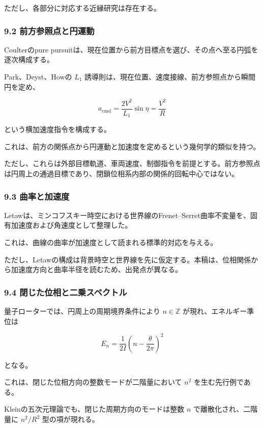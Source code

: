 \documentclass[
  10pt,
  a4paper,
]{ltjsarticle}
\begin{document}
ただし、各部分に対応する近縁研究は存在する。

\subsubsection{9.2
前方参照点と円運動}\label{ux524dux65b9ux53c2ux7167ux70b9ux3068ux5186ux904bux52d5}

Coulterのpure
pursuitは、現在位置から前方目標点を選び、その点へ至る円弧を逐次構成する。

Park、Deyst、Howの \(L_1\)
誘導則は、現在位置、速度接線、前方参照点から瞬間円を定め、

\[
a_{\mathrm{cmd}}
=\frac{2V^2}{L_1}\sin\eta
=\frac{V^2}{R}
\]

という横加速度指令を構成する。

これは、前方の関係点から円運動と加速度を定めるという幾何学的類似を持つ。

ただし、これらは外部目標軌道、車両速度、制御指令を前提とする。前方参照点は円周上の通過目標であり、閉鎖位相系内部の関係的回転中心ではない。

\subsubsection{9.3
曲率と加速度}\label{ux66f2ux7387ux3068ux52a0ux901fux5ea6}

Letawは、ミンコフスキー時空における世界線のFrenet--Serret曲率不変量を、固有加速度および角速度として整理した。

これは、曲線の曲率が加速度として読まれる標準的対応を与える。

ただし、Letawの構成は背景時空と世界線を先に仮定する。本稿は、位相関係から加速度方向と曲率半径を読むため、出発点が異なる。

\subsubsection{9.4
閉じた位相と二乗スペクトル}\label{ux9589ux3058ux305fux4f4dux76f8ux3068ux4e8cux4e57ux30b9ux30daux30afux30c8ux30eb}

量子ローターでは、円周上の周期境界条件により \(n\in\mathbb Z\)
が現れ、エネルギー準位は

\[
E_n
=\frac{1}{2I}
\left(
n-\frac{\theta}{2\pi}
\right)^2
\]

となる。

これは、閉じた位相方向の整数モードが二階量において \(n^2\)
を生む先行例である。

Kleinの五次元理論でも、閉じた周期方向のモードは整数 \(n\)
で離散化され、二階量に \(n^2/R^2\) 型の項が現れる。
\end{document}

